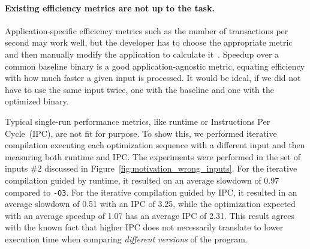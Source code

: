     \paragraph{Existing efficiency metrics are not up to the task.} Application-specific efficiency metrics such as the number of transactions per second may
    work well, but the developer has to choose the appropriate metric and then manually modify the application to calculate it~\cite{alameldeen06,coppa14}. Speedup
    over a common baseline binary is a good application-agnostic metric, equating efficiency with how much faster a given input is
    processed. It would be ideal, if we did not have to use the same input twice, one with the baseline and one with the optimized binary.

    Typical single-run performance metrics, like runtime or Instructions Per Cycle~(IPC), are not fit for purpose.
    To show this, we performed iterative compilation executing each optimization sequence with a different input and then measuring both runtime and IPC.
    The experiments were performed in the set of inputs \#2 discussed in Figure~\ref{fig:motivation_wrong_inputs}.
    For the iterative compilation guided by runtime, it resulted on an average slowdown of 0.97 compared to \texttt{-O3}.
    For the iterative compilation guided by IPC, it resulted in an average slowdown of 0.51 with an IPC of 3.25, while the optimization expected with an average speedup of 1.07 has an average IPC of 2.31.
    This result agrees with the known fact that higher IPC does not necessarily translate to lower execution time when comparing \emph{different versions} of the program.


